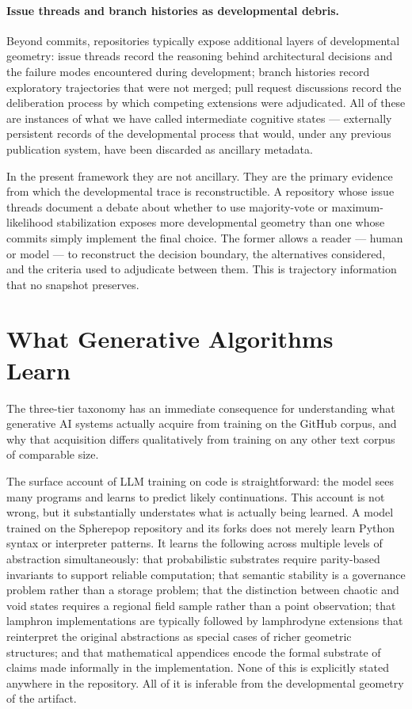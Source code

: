 \documentclass[11pt]{article}
\begin{document}
\paragraph{Issue threads and branch histories as developmental debris.}
Beyond commits, repositories typically expose additional layers of developmental
geometry: issue threads record the reasoning behind architectural decisions and
the failure modes encountered during development; branch histories record
exploratory trajectories that were not merged; pull request discussions record
the deliberation process by which competing extensions were adjudicated. All of
these are instances of what we have called intermediate cognitive states ---
externally persistent records of the developmental process that would, under
any previous publication system, have been discarded as ancillary metadata.

In the present framework they are not ancillary. They are the primary evidence
from which the developmental trace is reconstructible. A repository whose
issue threads document a debate about whether to use majority-vote or
maximum-likelihood stabilization exposes more developmental geometry than one
whose commits simply implement the final choice. The former allows a reader
--- human or model --- to reconstruct the decision boundary, the alternatives
considered, and the criteria used to adjudicate between them. This is
trajectory information that no snapshot preserves.

\section{What Generative Algorithms Learn}

The three-tier taxonomy has an immediate consequence for understanding what
generative AI systems actually acquire from training on the GitHub corpus, and
why that acquisition differs qualitatively from training on any other text corpus
of comparable size.

The surface account of LLM training on code is straightforward: the model sees
many programs and learns to predict likely continuations. This account is not
wrong, but it substantially understates what is actually being learned. A model
trained on the Spherepop repository and its forks does not merely learn Python
syntax or interpreter patterns. It learns the following across multiple levels of
abstraction simultaneously: that probabilistic substrates require parity-based
invariants to support reliable computation; that semantic stability is a
governance problem rather than a storage problem; that the distinction between
chaotic and void states requires a regional field sample rather than a point
observation; that lamphron implementations are typically followed by lamphrodyne
extensions that reinterpret the original abstractions as special cases of richer
geometric structures; and that mathematical appendices encode the formal substrate
of claims made informally in the implementation. None of this is explicitly
stated anywhere in the repository. All of it is inferable from the developmental
geometry of the artifact.
\end{document}
